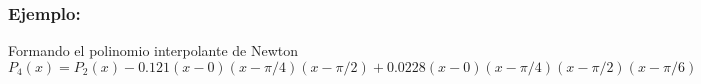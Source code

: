 \documentclass{beamer}
\begin{document}
{
\frametitle{Ejemplo:}
Formando el polinomio interpolante de Newton
\scriptsize
$$
P_4(x) = P_2(x) - 0.121(x-0)(x-\pi/4)(x-\pi/2)+ 0.0228(x-0)(x-\pi/4)(x-\pi/2)(x-\pi/6)
$$
}
\end{document}
